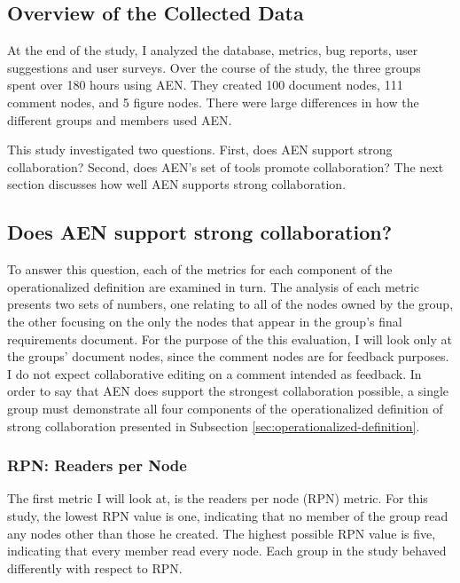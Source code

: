 \subsection{Overview of the Collected Data}
\label{sec:data-overview}


At the end of the study, I analyzed the database, metrics, bug reports,
user suggestions and user surveys.  Over the course of the study, the three
groups spent over 180 hours using AEN. They created 100 document nodes, 111
comment nodes, and 5 figure nodes.  There were large differences in how the
different groups and members used AEN.  

This study investigated two questions. First, does AEN support strong
collaboration? Second, does AEN's set of tools promote collaboration?  The
next section discusses how well AEN supports strong collaboration.

\subsection{Does AEN support strong collaboration?}
\label{sec:AEN-supports}

To answer this question, each of the metrics for each component of the
operationalized definition are examined in turn.  The analysis of each
metric presents two sets of numbers, one relating to all of the nodes owned
by the group, the other focusing on the only the nodes that appear in the
group's final requirements document.  For the purpose of the this
evaluation, I will look only at the groups' document nodes, since the
comment nodes are for feedback purposes.  I do not expect collaborative
editing on a comment intended as feedback.  In order to say that AEN does
support the strongest collaboration possible, a single group must
demonstrate all four components of the operationalized definition of strong
collaboration presented in Subsection \ref{sec:operationalized-definition}.

\subsubsection{RPN: Readers per Node}

The first metric I will look at, is the readers per node (RPN) metric. For
this study, the lowest RPN value is one, indicating that no member of the
group read any nodes other than those he created.  The highest possible RPN
value is five, indicating that every member read every node.  Each group
in the study behaved differently with respect to RPN.


